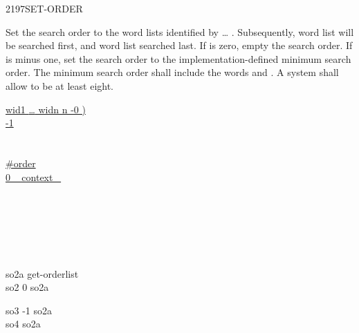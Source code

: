 \begin{worddef}{2197}{SET-ORDER}
\item {}

	Set the search order to the word lists identified by
	 {\ldots} . Subsequently, word list
	 will be searched first, and word list 
	searched last. If  is zero, empty the search order. If
	 is minus one, set the search order to the
	implementation-defined minimum search order. The minimum search
	order shall include the words  and
	. A system shall allow  to be at least
	eight.

	\begin{implement}
\cbstart{}
		\uline{}

		\uline{\word{:}   wid1 {\ldots} widn n -{}0 )} \\
		\tab \uline{ -1 \word{=} } \\
		\tab[2] \uline{ } \\
		\tab \uline{} \\
		\tab \uline{ \#order \word{!}} \\
		\tab \uline{0  ~   context \word{+} \word{!} ~ } \\
		\uline{\word{;}}
\cbend
	\end{implement}

	\begin{testing}\ttfamily
		 \\%
		 \\%

		 \\
		 \\

		\word{:} so2a  get-orderlist  \word{;} \\
		\word{:} so2 0  so2a \word{;}

			\tab[1.5]  

		\word{:} so3 -1  so2a \word{;} \\
		\word{:} so4  so2a \word{;}

			\tab {} 
	\end{testing}
\end{worddef}


